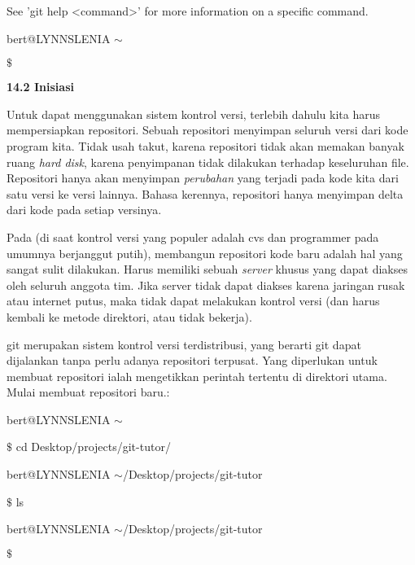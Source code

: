 \noindent 
{\fontsize{10pt}{10pt}\selectfont See 'git help <command>' for more information on a specific command.} \par
\noindent 
{\fontsize{10pt}{10pt}\selectfont bert@LYNNSLENIA  $  \sim  $} \par
\noindent 
{\fontsize{10pt}{10pt}\selectfont  $  \$  $} \par
\vspace{12pt}
\noindent 
\textbf{14.2 Inisiasi} \par
Untuk dapat menggunakan sistem kontrol versi, terlebih dahulu kita harus mempersiapkan repositori. Sebuah repositori menyimpan seluruh versi dari kode program kita. Tidak usah takut, karena repositori tidak akan memakan banyak ruang \emph{hard disk}, karena penyimpanan tidak dilakukan terhadap keseluruhan file. Repositori hanya akan menyimpan \emph{perubahan} yang terjadi pada kode kita dari satu versi ke versi lainnya. Bahasa kerennya, repositori hanya menyimpan delta dari kode pada setiap versinya. \par
Pada (di saat kontrol versi yang populer adalah cvs dan programmer pada umumnya berjanggut putih), membangun repositori kode baru adalah hal yang sangat sulit dilakukan. Harus memiliki sebuah \emph{server} khusus yang dapat diakses oleh seluruh anggota tim. Jika server tidak dapat diakses karena jaringan rusak atau internet putus, maka tidak dapat melakukan kontrol versi (dan harus kembali ke metode direktori, atau tidak bekerja). \par
git merupakan sistem kontrol versi terdistribusi, yang berarti git dapat dijalankan tanpa perlu adanya repositori terpusat. Yang diperlukan untuk membuat repositori ialah mengetikkan perintah tertentu di direktori utama. Mulai membuat repositori baru.: \par
\noindent 
{\fontsize{10pt}{10pt}\selectfont bert@LYNNSLENIA  $  \sim  $} \par
\noindent 
{\fontsize{10pt}{10pt}\selectfont  $  \$  $ cd Desktop/projects/git-tutor/} \par
\noindent 
{\fontsize{10pt}{10pt}\selectfont bert@LYNNSLENIA  $  \sim  $/Desktop/projects/git-tutor} \par
\noindent 
{\fontsize{10pt}{10pt}\selectfont  $  \$  $ ls} \par
\noindent 
{\fontsize{10pt}{10pt}\selectfont bert@LYNNSLENIA  $  \sim  $/Desktop/projects/git-tutor} \par
\noindent 
{\fontsize{10pt}{10pt}\selectfont  $  \$  $} \par
\noindent 
